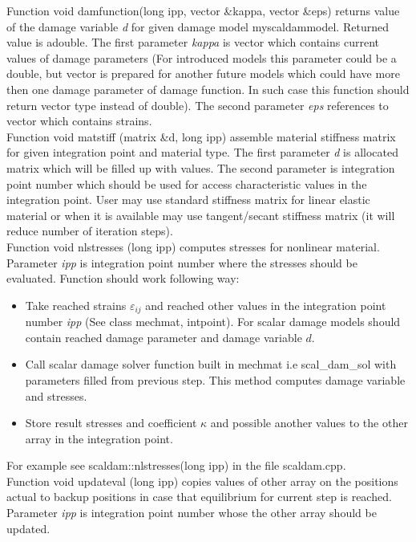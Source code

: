 Function {\sf void damfunction(long ipp, vector  \&kappa, vector \&eps)} returns value of the damage
variable {\it d} for given damage model {\sf myscaldammodel}. Returned value is a{\sf double}.
The first parameter {\it kappa} is vector which contains current values of damage parameters (For
introduced models this parameter could be a {\sf double}, but {\sf vector} is prepared for another
future models which could have more then one damage parameter of damage function. In such case this
function should return {\sf vector} type instead of {\sf double}). The second parameter {\it eps}
references to vector which contains strains.\\

Function {\sf void matstiff (matrix  \&d, long ipp)} assemble material stiffness matrix for given
integration point and material type. The first parameter {\it d} is allocated matrix which will be
filled up with values. The second parameter is integration point number which should be used for
access characteristic values in the integration point. User may use standard stiffness matrix for
linear elastic material or when it is available may use tangent/secant stiffness matrix (it will reduce
number of iteration steps).\\

Function {\sf void nlstresses (long ipp)} computes stresses for nonlinear material. Parameter
{\it ipp} is integration point number where the stresses should be evaluated. Function should
work following way:
\begin{itemize}
\item
Take reached strains $\varepsilon_{ij}$ and reached {\sf other} values in the integration point number
{\it ipp} (See class {\sf mechmat, intpoint}). For scalar damage models should contain reached damage
parameter and damage variable  $d$.
\item
Call scalar damage solver function built in {\sf mechmat} i.e {\sf scal\_dam\_sol} with parameters filled
from previous step. This method computes damage variable and stresses.
\item
Store result stresses and coefficient $\kappa$ and possible another values to the {\sf other}
array in the integration point.
\end{itemize}
For example see {\sf scaldam::nlstresses(long ipp)} in the file scaldam.cpp.\\

Function {\sf void updateval (long ipp)} copies values of {\sf other} array on the positions actual to
backup positions in case that equilibrium for current step is reached. Parameter {\it ipp} is
integration point number whose the {\sf other} array should be updated.


